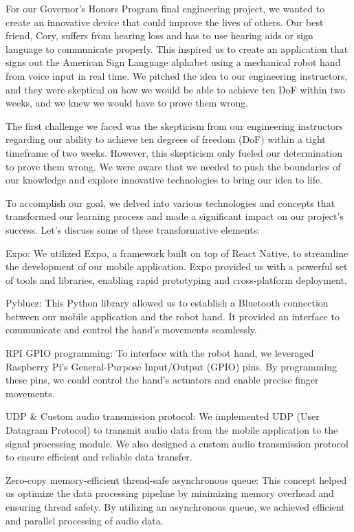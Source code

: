 For our Governor's Honors Program final engineering project, we wanted to create an innovative device that could improve the lives of others. Our best friend, Cory, suffers from hearing loss and has to use hearing aids or sign language to communicate properly. This inspired us to create an application that signs out the American Sign Language alphabet using a mechanical robot hand from voice input in real time. We pitched the idea to our engineering instructors, and they were skeptical on how we would be able to achieve ten DoF within two weeks, and we knew we would have to prove them wrong. 

The first challenge we faced was the skepticism from our engineering instructors regarding our ability to achieve ten degrees of freedom (DoF) within a tight timeframe of two weeks. However, this skepticism only fueled our determination to prove them wrong. We were aware that we needed to push the boundaries of our knowledge and explore innovative technologies to bring our idea to life.

To accomplish our goal, we delved into various technologies and concepts that transformed our learning process and made a significant impact on our project's success. Let's discuss some of these transformative elements:

Expo: We utilized Expo, a framework built on top of React Native, to streamline the development of our mobile application. Expo provided us with a powerful set of tools and libraries, enabling rapid prototyping and cross-platform deployment.

Pybluez: This Python library allowed us to establish a Bluetooth connection between our mobile application and the robot hand. It provided an interface to communicate and control the hand's movements seamlessly.

RPI GPIO programming: To interface with the robot hand, we leveraged Raspberry Pi's General-Purpose Input/Output (GPIO) pins. By programming these pins, we could control the hand's actuators and enable precise finger movements.

UDP & Custom audio transmission protocol: We implemented UDP (User Datagram Protocol) to transmit audio data from the mobile application to the signal processing module. We also designed a custom audio transmission protocol to ensure efficient and reliable data transfer.

Zero-copy memory-efficient thread-safe asynchronous queue: This concept helped us optimize the data processing pipeline by minimizing memory overhead and ensuring thread safety. By utilizing an asynchronous queue, we achieved efficient and parallel processing of audio data.

